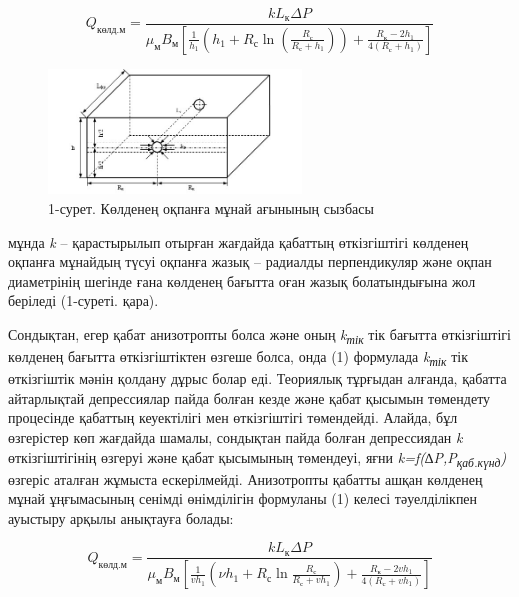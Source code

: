 \begin{equation}
    Q_{\text{көлд.м}} = \frac{kL_{\text{к}} \Delta P}{\mu_{\text{м}} B_{\text{м}} \left[ \frac{1}{h_1} \left( h_1 + R_{\text{с}} \ln \left( \frac{R_{\text{с}}}{R_{\text{с}} + h_1} \right) \right) + \frac{R_{\text{к}} - 2h_1}{4 (R_{\text{с}} + h_1)} \right]}
    \end{equation}
    
 




\begin{figure}[H]
	\centering
	\includegraphics[width=0.6\textwidth]{media/gor/image23.1}
	\caption*{1-сурет. Көлденең оқпанға мұнай ағынының сызбасы}
\end{figure}

\begin{multicols}{2}

мұнда \emph{k} -- қарастырылып отырған жағдайда қабаттың өткізгіштігі
көлденең оқпанға мұнайдың түсуі оқпанға жазық -- радиалды перпендикуляр
және оқпан диаметрінің шегінде ғана көлденең бағытта оған жазық
болатындығына жол беріледі (1-суреті. қара).

Сондықтан, егер қабат анизотропты болса және оның
\emph{k\textsubscript{тік}} тік бағытта өткізгіштігі көлденең бағытта
өткізгіштіктен өзгеше болса, онда (1) формулада
\emph{k\textsubscript{тік}} тік өткізгіштік мәнін қолдану дұрыс болар
еді. Теориялық тұрғыдан алғанда, қабатта айтарлықтай депрессиялар пайда
болған кезде және қабат қысымын төмендету процесінде қабаттың
кеуектілігі мен өткізгіштігі төмендейді. Алайда, бұл өзгерістер көп
жағдайда шамалы, сондықтан пайда болған депрессиядан \emph{k}
өткізгіштігінің өзгеруі және қабат қысымының төмендеуі, яғни
\emph{k=f(∆P,P\textsubscript{қаб.күнд})} өзгеріс аталған жұмыста
ескерілмейді. Анизотропты қабатты ашқан көлденең мұнай ұңғымасының
сенімді өнімділігін формуланы (1) келесі тәуелділікпен ауыстыру арқылы
анықтауға болады:


\end{multicols}
\begin{equation}
    Q_{\text{көлд.м}} = \frac{kL_{\text{к}} \Delta P}{\mu_{\text{м}} B_{\text{м}} \left[ \frac{1}{v h_1} \left( \nu h_1 + R_{\text{с}} \ln \frac{R_{\text{с}}}{R_{\text{с}} + v h_1} \right) + \frac{R_{\text{к}} - 2v h_1}{4 (R_{\text{с}} + v h_1)} \right]}
    \end{equation}
    
